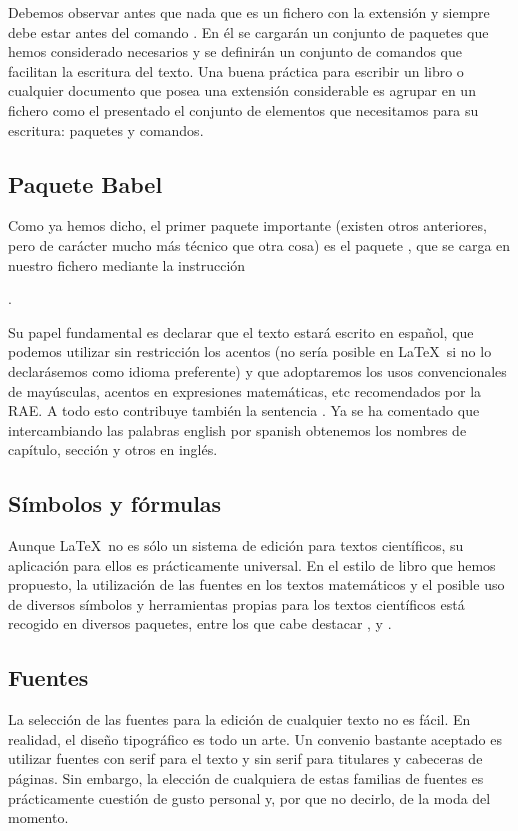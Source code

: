 Debemos observar antes que nada que es un fichero con la extensión  y siempre debe estar antes del comando . En él se cargarán un conjunto de paquetes que hemos considerado necesarios y se definirán un conjunto de comandos que facilitan la escritura del texto. Una buena práctica para escribir un libro o cualquier documento que posea una extensión considerable es agrupar en un fichero como el presentado el conjunto de elementos que necesitamos para su escritura: paquetes y comandos.

\subsection{Paquete Babel}
Como ya hemos dicho, el primer paquete importante (existen otros anteriores, pero de carácter mucho más técnico que otra cosa) es el paquete , que se carga en nuestro fichero mediante la instrucción 

. 

Su papel fundamental es declarar que el texto estará escrito en español, que podemos utilizar sin restricción los acentos (no sería posible en \LaTeX\ si no lo declarásemos como idioma preferente) y que adoptaremos los usos convencionales de mayúsculas, acentos en expresiones matemáticas, etc recomendados por la RAE. A todo esto contribuye también la sentencia . Ya se ha comentado que intercambiando las palabras english por spanish obtenemos los nombres de capítulo, sección y otros en inglés.

\subsection{Símbolos y fórmulas}
Aunque \LaTeX\ no es sólo un sistema de edición para textos científicos, su aplicación para ellos es prácticamente universal. En el estilo de libro que hemos propuesto, la utilización de las fuentes en los textos matemáticos y el posible uso de diversos símbolos y herramientas propias para los textos científicos está recogido en diversos paquetes, entre los que cabe destacar ,  y .

\subsection{Fuentes}
La selección de las fuentes para la edición de cualquier texto no es fácil. En realidad, el diseño tipográfico es todo un arte. Un convenio bastante aceptado es utilizar fuentes con serif para el texto y sin serif para titulares y cabeceras de páginas. Sin embargo, la elección de cualquiera de estas familias de fuentes es prácticamente cuestión de gusto personal y, por que no decirlo, de la moda del momento.

